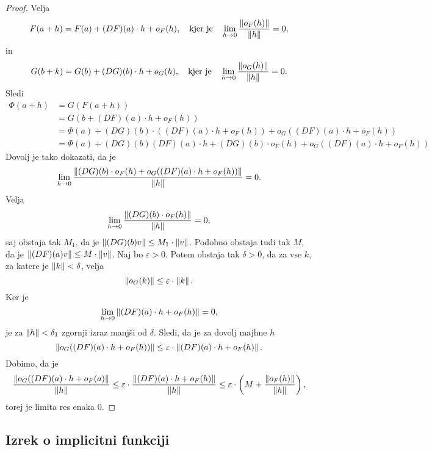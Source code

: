 \begin{proof}
Velja
\[
F(a+h) = F(a) + (DF)(a) \cdot h + o_F(h),
\quad \text{kjer je} \quad
\lim_{h \to 0}\frac{\left\lVert o_F(h)\right\rVert}{\left\lVert h\right\rVert} = 0,
\]
in
\[
G(b+k) = G(b) + (DG)(b) \cdot h + o_G(h),
\quad \text{kjer je} \quad
\lim_{h \to 0}\frac{\left\lVert o_G(h)\right\rVert}{\left\lVert h\right\rVert} = 0.
\]
Sledi
\begin{align*}
\Phi(a+h) &= G(F(a+h))
\\
&= G(b + (DF)(a) \cdot h + o_F(h))
\\
&= \Phi(a) + (DG)(b) \cdot ((DF)(a) \cdot h +
o_F(h)) + o_G((DF)(a) \cdot h + o_F(h))
\\
&= \Phi(a) + (DG)(b)(DF)(a) \cdot h +
(DG)(b) \cdot o_F(h) + o_G((DF)(a) \cdot h + o_F(h))
\end{align*}
Dovolj je tako dokazati, da je
\[
\lim_{h \to 0}\frac{
\left\lVert (DG)(b) \cdot o_F(h) + o_G((DF)(a) \cdot h + o_F(h))\right\rVert
}{\left\lVert h\right\rVert} = 0.
\]
Velja
\[
\lim_{h \to 0}\frac{\left\lVert (DG)(b) \cdot o_F(h)\right\rVert}{\left\lVert h\right\rVert} = 0,
\]
saj obstaja tak $M_1$, da je
$\left\lVert (DG)(b) v\right\rVert \leq M_1 \cdot \left\lVert v\right\rVert$. Podobno obstaja tudi
tak $M$, da je $\left\lVert (DF)(a) v\right\rVert \leq M \cdot \left\lVert v\right\rVert$.
Naj bo $\varepsilon > 0$. Potem obstaja tak $\delta > 0$, da za vse
$k$, za katere je $\left\lVert k\right\rVert < \delta$, velja
\[
\left\lVert o_G(k)\right\rVert \leq \varepsilon \cdot \left\lVert k\right\rVert.
\]
Ker je
\[
\lim_{h \to 0} \left\lVert (DF)(a) \cdot h + o_F(h)\right\rVert = 0,
\]
je za $\left\lVert h\right\rVert < \delta_1$ zgornji izraz manjši od $\delta$.
Sledi, da je za dovolj majhne $h$
\[
\left\lVert o_G((DF)(a) \cdot h + o_F(h))\right\rVert \leq
\varepsilon \cdot \left\lVert (DF)(a) \cdot h + o_F(h)\right\rVert.
\]
Dobimo, da je
\[
\frac{\left\lVert o_G((DF)(a) \cdot h + o_F(a)\right\rVert}{\left\lVert h\right\rVert} \leq
\varepsilon \cdot
\frac{\left\lVert (DF)(a) \cdot h + o_F(h)\right\rVert}{\left\lVert h\right\rVert} \leq
\varepsilon \cdot \left(M + \frac{\left\lVert o_F(h)\right\rVert}{\left\lVert h\right\rVert}\right),
\]
torej je limita res enaka $0$.
\end{proof}

\newpage

\subsection{Izrek o implicitni funkciji}

